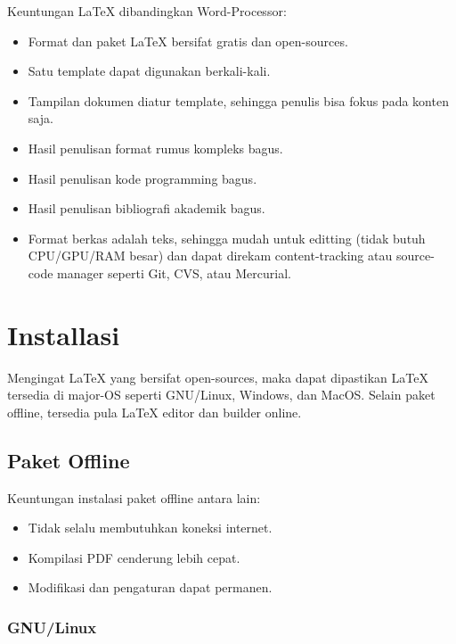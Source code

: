 \documentclass{book} %
\begin{document}
    \bigskip

    Keuntungan \LaTeX{} dibandingkan Word-Processor:
    \begin{itemize}
    	\item Format dan paket \LaTeX{} bersifat gratis dan open-sources.
        \item Satu template dapat digunakan berkali-kali.
        \item Tampilan dokumen diatur template, sehingga penulis bisa fokus pada konten saja.
        \item Hasil penulisan format rumus kompleks bagus.
        \item Hasil penulisan kode programming bagus.
        \item Hasil penulisan bibliografi akademik bagus.
        \item Format berkas adalah teks, sehingga mudah untuk editting (tidak butuh CPU/GPU/RAM besar)
        dan dapat direkam content-tracking atau source-code manager seperti Git, CVS, atau Mercurial.
    \end{itemize}


	\chapter{Installasi}

	Mengingat \LaTeX{} yang bersifat open-sources, maka dapat dipastikan \LaTeX{} tersedia di major-OS seperti GNU/Linux, Windows, dan MacOS.
	Selain paket offline, tersedia pula \LaTeX{} editor dan builder online.

	\section{Paket Offline}

	Keuntungan instalasi paket offline antara lain:

	\begin{itemize}
		\item Tidak selalu membutuhkan koneksi internet.
		\item Kompilasi PDF cenderung lebih cepat.
		\item Modifikasi dan pengaturan dapat permanen.
	\end{itemize}

	\subsection{GNU/Linux}
\end{document}
